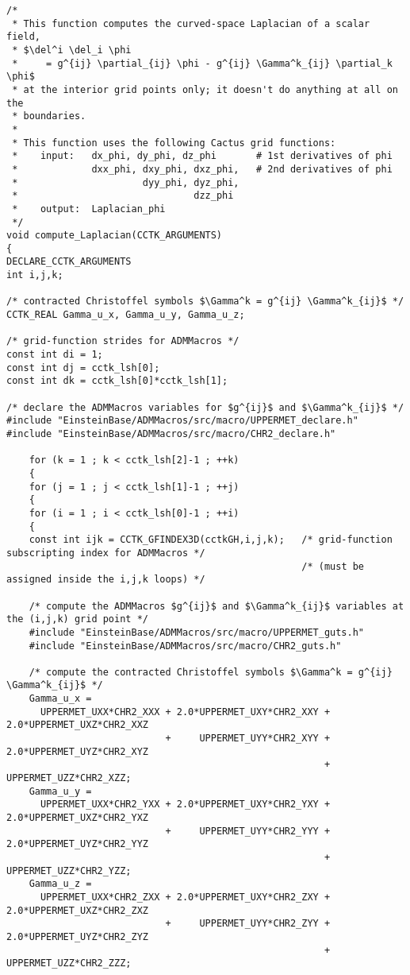 \newpage	%
\begingroup
\footnotesize
\begin{verbatim}
/*
 * This function computes the curved-space Laplacian of a scalar field,
 * $\del^i \del_i \phi
 *     = g^{ij} \partial_{ij} \phi - g^{ij} \Gamma^k_{ij} \partial_k \phi$
 * at the interior grid points only; it doesn't do anything at all on the
 * boundaries.
 *
 * This function uses the following Cactus grid functions:
 *    input:   dx_phi, dy_phi, dz_phi       # 1st derivatives of phi
 *             dxx_phi, dxy_phi, dxz_phi,   # 2nd derivatives of phi
 *                      dyy_phi, dyz_phi,
 *                               dzz_phi
 *    output:  Laplacian_phi
 */
void compute_Laplacian(CCTK_ARGUMENTS)
{
DECLARE_CCTK_ARGUMENTS
int i,j,k;

/* contracted Christoffel symbols $\Gamma^k = g^{ij} \Gamma^k_{ij}$ */
CCTK_REAL Gamma_u_x, Gamma_u_y, Gamma_u_z;

/* grid-function strides for ADMMacros */
const int di = 1;
const int dj = cctk_lsh[0];
const int dk = cctk_lsh[0]*cctk_lsh[1];

/* declare the ADMMacros variables for $g^{ij}$ and $\Gamma^k_{ij}$ */
#include "EinsteinBase/ADMMacros/src/macro/UPPERMET_declare.h"
#include "EinsteinBase/ADMMacros/src/macro/CHR2_declare.h"

    for (k = 1 ; k < cctk_lsh[2]-1 ; ++k)
    {
    for (j = 1 ; j < cctk_lsh[1]-1 ; ++j)
    {
    for (i = 1 ; i < cctk_lsh[0]-1 ; ++i)
    {
    const int ijk = CCTK_GFINDEX3D(cctkGH,i,j,k);   /* grid-function subscripting index for ADMMacros */
                                                    /* (must be assigned inside the i,j,k loops) */

    /* compute the ADMMacros $g^{ij}$ and $\Gamma^k_{ij}$ variables at the (i,j,k) grid point */
    #include "EinsteinBase/ADMMacros/src/macro/UPPERMET_guts.h"
    #include "EinsteinBase/ADMMacros/src/macro/CHR2_guts.h"

    /* compute the contracted Christoffel symbols $\Gamma^k = g^{ij} \Gamma^k_{ij}$ */
    Gamma_u_x =
      UPPERMET_UXX*CHR2_XXX + 2.0*UPPERMET_UXY*CHR2_XXY + 2.0*UPPERMET_UXZ*CHR2_XXZ
                            +     UPPERMET_UYY*CHR2_XYY + 2.0*UPPERMET_UYZ*CHR2_XYZ
                                                        +     UPPERMET_UZZ*CHR2_XZZ;
    Gamma_u_y =
      UPPERMET_UXX*CHR2_YXX + 2.0*UPPERMET_UXY*CHR2_YXY + 2.0*UPPERMET_UXZ*CHR2_YXZ
                            +     UPPERMET_UYY*CHR2_YYY + 2.0*UPPERMET_UYZ*CHR2_YYZ
                                                        +     UPPERMET_UZZ*CHR2_YZZ;
    Gamma_u_z =
      UPPERMET_UXX*CHR2_ZXX + 2.0*UPPERMET_UXY*CHR2_ZXY + 2.0*UPPERMET_UXZ*CHR2_ZXZ
                            +     UPPERMET_UYY*CHR2_ZYY + 2.0*UPPERMET_UYZ*CHR2_ZYZ
                                                        +     UPPERMET_UZZ*CHR2_ZZZ;


\end{verbatim}
